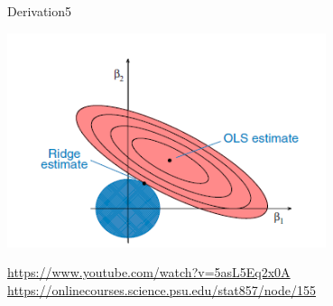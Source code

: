 \begin{questions}
\begin{question}[bonus]{Derivation}{5}
\begin{answer}
				\begin{center}
					\includegraphics[width=0.7\textwidth]{img/ridge.png} 
				\end{center}

		
		\url{https://www.youtube.com/watch?v=5asL5Eq2x0A}\\
		\url{https://onlinecourses.science.psu.edu/stat857/node/155}
	\end{answer}
	
	
	\end{question}	
	
\end{questions}


